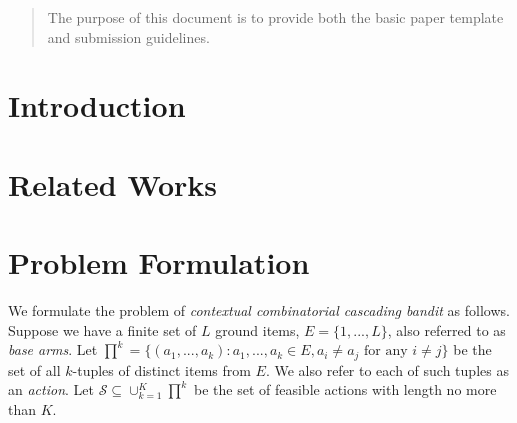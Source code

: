 \documentclass{article}
\newcommand{\cS}{\mathcal{S}}
\begin{document}
 
	
	
\begin{abstract} 
The purpose of this document is to provide both the basic paper template and submission guidelines.
\end{abstract} 
	
\section{Introduction}
	
\section{Related Works}
	
\section{Problem Formulation}

We formulate the problem of {\em contextual combinatorial cascading bandit} as follows. Suppose we have a finite set of $L$ ground items,  $E=\{1,...,L\}$, also referred to as {\em base arms}. 
Let $\prod^k=\{(a_1,...,a_k): a_1,...,a_k \in E, a_i \neq a_j \text{ for any } i \neq j\}$ be the set of all $k$-tuples of distinct items from $E$. We also refer to each of such tuples as an {\em action}.
Let $\cS \subseteq \cup_{k=1}^K \prod^{k}$ be the set of feasible actions with length no more than $K$.
\end{document}

